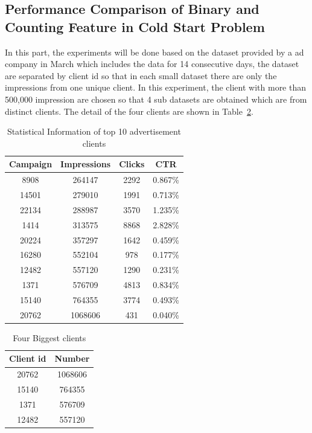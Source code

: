 \documentclass{sig-alternate}
\begin{document}
\subsection{Performance Comparison of Binary and Counting Feature in Cold Start Problem}

In this part, the experiments will be done based on the dataset provided by a ad company in March which includes the data for 14 consecutive days, the dataset are separated by client id so that in each small dataset there are only the impressions from one unique client. In this experiment, the client with more than 500,000 impression are chosen so that 4 sub datasets are obtained which are from distinct clients. The detail of the four clients are shown in Table~\ref{tab:campainid}.


\begin{table}[t]
\centering
\begin{tabular}{c | c | c | c }
Campaign & Impressions & Clicks & CTR\\
\hline
8908 & 264147 & 2292 & 0.867\% \\
14501 & 279010 & 1991 & 0.713\% \\
22134 & 288987 & 3570 & 1.235\% \\
1414 & 313575 & 8868 & 2.828\% \\
20224 & 357297 & 1642 & 0.459\% \\
16280 & 552104 & 978 & 0.177\% \\
12482 & 557120 & 1290 & 0.231\% \\
1371 & 576709 & 4813 & 0.834\% \\
15140 & 764355 & 3774 & 0.493\% \\
20762 & 1068606 & 431 & 0.040\% 
\end{tabular}
\caption{Statistical Information of top 10 advertisement clients}
\label{tab:campainid}
\end{table}

\iffalse
\begin{table}[t]
 \centering
 \begin{tabular}{ ||c c || } 
 \hline
 Client id  & Number \\
 \hline
 20762 & 1068606 \\ 
  15140 & 764355 \\ 
   1371 & 576709 \\ 
   12482 & 557120\\
 \hline
 \end{tabular}
 \caption{Four Biggest clients}
 \label{tab:campainid}
 \end{table}
 
\end{document}
